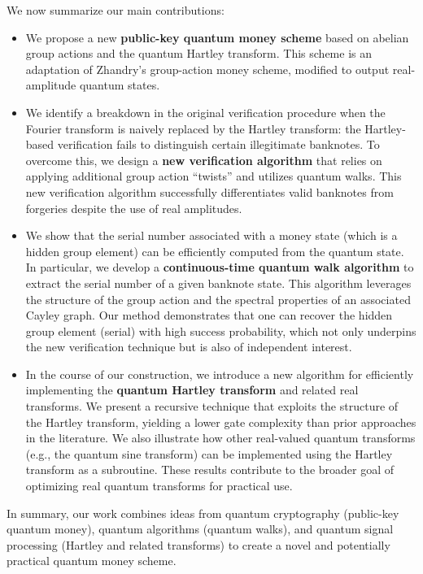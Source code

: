\documentclass[11pt]{article}
\theoremstyle{definition}
\begin{document}
We now summarize our main contributions:
\begin{itemize}
    \item We propose a new \textbf{public-key quantum money scheme} based on abelian group actions and the quantum Hartley transform. This scheme is an adaptation of Zhandry’s group-action money scheme, modified to output real-amplitude quantum states. 
    \item We identify a breakdown in the original verification procedure when the Fourier transform is naively replaced by the Hartley transform: the Hartley-based verification fails to distinguish certain illegitimate banknotes. To overcome this, we design a \textbf{new verification algorithm} that relies on applying additional group action “twists” and utilizes quantum walks. This new verification algorithm successfully differentiates valid banknotes from forgeries despite the use of real amplitudes.
    \item We show that the serial number associated with a money state (which is a hidden group element) can be efficiently computed from the quantum state. In particular, we develop a \textbf{continuous-time quantum walk algorithm} to extract the serial number of a given banknote state. This algorithm leverages the structure of the group action and the spectral properties of an associated Cayley graph. Our method demonstrates that one can recover the hidden group element (serial) with high success probability, which not only underpins the new verification technique but is also of independent interest.
    \item In the course of our construction, we introduce a new algorithm for efficiently implementing the \textbf{quantum Hartley transform} and related real transforms. We present a recursive technique that exploits the structure of the Hartley transform, yielding a lower gate complexity than prior approaches in the literature. We also illustrate how other real-valued quantum transforms (e.g., the quantum sine transform) can be implemented using the Hartley transform as a subroutine. These results contribute to the broader goal of optimizing real quantum transforms for practical use.
\end{itemize}

In summary, our work combines ideas from quantum cryptography (public-key quantum money), quantum algorithms (quantum walks), and quantum signal processing (Hartley and related transforms) to create a novel and potentially practical quantum money scheme. 
\end{document}
